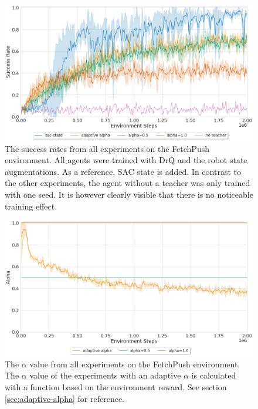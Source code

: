 \begin{figure}
    \centering
    \includegraphics[width=\textwidth]{images/results/push/success_rate.png}
    \caption[The success rates from all experiments on the FetchPush environment.]{The success rates from all experiments on the FetchPush environment. All agents were trained with DrQ and the robot state augmentations. As a reference, SAC state is added. In contrast to the other experiments, the agent without a teacher was only trained with one seed. It is however clearly visible that there is no noticeable training effect.}
    \label{fig:results:push-success}
\end{figure}
\begin{figure}
    \centering
    \includegraphics[width=\textwidth]{images/results/push/alpha.png}
    \caption[The $\alpha$ value from all experiments on the FetchPush environment.]{The $\alpha$ value from all experiments on the FetchPush environment. The $\alpha$ value of the experiments with an adaptive $\alpha$ is calculated with a function based on the environment reward. See section \ref{sec:adaptive-alpha} for reference.}
    \label{fig:results:push-alpha}
\end{figure}

